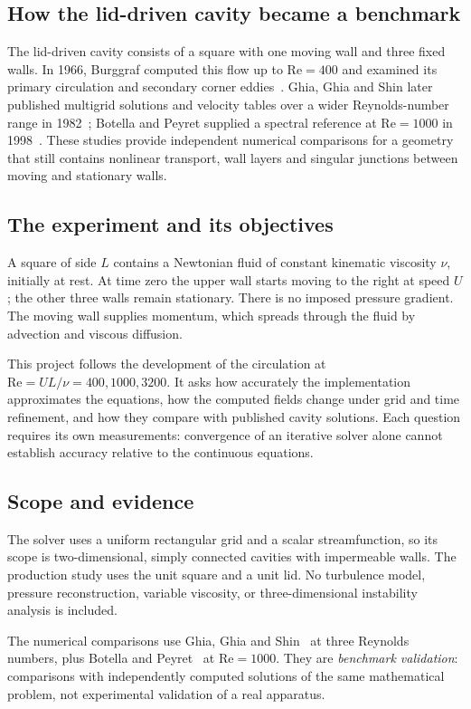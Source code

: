 \documentclass[11pt,a4paper]{article}
\newcommand{\Rey}{\mathrm{Re}}
\begin{document}
\subsection{How the lid-driven cavity became a benchmark}
The lid-driven cavity consists of a square with one moving wall and three
fixed walls. In 1966, Burggraf computed this flow up to
$\Rey=400$ and examined its primary circulation and secondary corner
eddies~\cite{burggraf1966}. Ghia, Ghia and Shin later published multigrid
solutions and velocity tables over a wider Reynolds-number range in
1982~\cite{ghia1982}; Botella and Peyret supplied a spectral reference at
$\Rey=1000$ in 1998~\cite{botella1998}. These studies provide independent
numerical comparisons for a geometry that still contains nonlinear transport,
wall layers and singular junctions between moving and stationary walls.

\clearpage
\subsection{The experiment and its objectives}
A square of side $L$ contains a Newtonian fluid of constant kinematic viscosity
$\nu$, initially at rest. At time zero the upper wall starts moving to the
right at speed $U$; the other three walls remain stationary. There is no imposed
pressure gradient. The moving wall supplies momentum, which spreads through
the fluid by advection and viscous diffusion.

This project follows the development of the circulation at
$\Rey=UL/\nu=400,1000,3200$. It asks how accurately the implementation
approximates the equations, how the computed fields change under grid and
time refinement, and how they compare with published cavity solutions.
Each question requires its own measurements: convergence of an iterative
solver alone cannot establish accuracy relative to the continuous equations.

\subsection{Scope and evidence}
The solver uses a uniform rectangular grid and a scalar streamfunction, so its
scope is two-dimensional, simply connected cavities with impermeable walls.
The production study uses the unit square and a unit lid. No turbulence model,
pressure reconstruction, variable viscosity, or three-dimensional instability
analysis is included.

The numerical comparisons use Ghia, Ghia and Shin~\cite{ghia1982} at three
Reynolds numbers, plus Botella and Peyret~\cite{botella1998} at $\Rey=1000$.
They are \emph{benchmark validation}: comparisons with independently computed
solutions of the same mathematical problem, not experimental validation of a
real apparatus.
\end{document}
